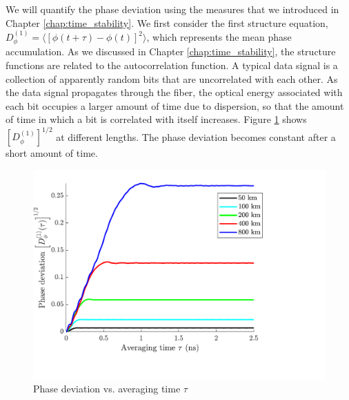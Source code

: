 We will quantify the phase deviation using the measures that we introduced in Chapter \ref{chap:time_stability}. We first consider the first structure equation, $D^{(1)}_\phi = \langle [\phi(t+\tau) - \phi(t)]^2 \rangle$, which represents the mean phase accumulation. As we discussed in Chapter \ref{chap:time_stability}, the structure functions are related to the autocorrelation function. A typical data signal is a collection of apparently random bits that are uncorrelated with each other. As the data signal propagates through the fiber, the optical energy associated with each bit occupies a larger amount of time due to dispersion, so that the amount of time in which a bit is correlated with itself increases. Figure \ref{fig:NAPhaseStability} shows $\left[D^{(1)}_\phi\right]^{1/2}$ at different lengths. The phase deviation becomes constant after a short amount of time.
%
\begin{figure}[htb]
	\centering
	\includegraphics[scale=0.9]{img/NAPhaseStability}
	\caption{Phase deviation vs. averaging time $\tau$} \label{fig:NAPhaseStability}
\end{figure}
%

